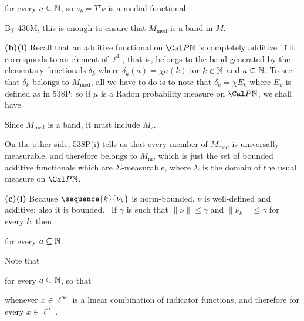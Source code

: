 {

\noindent for every $a\subseteq\Bbb N$, so $\nu_b=T'\nu$ is a medial
functional.\ \Qed

By 436M, this is enough to ensure that $M_{\text{med}}$ is a band in $M$.

\medskip

{\bf (b)(i)} Recall that an additive functional on $\Cal P\Bbb N$
is completely additive iff it corresponds to an element of $\ell^1$,
that is,
belongs to the band generated by the elementary functionals $\delta_k$
where $\delta_k(a)=\chi a(k)$ for $k\in\Bbb N$ and $a\subseteq\Bbb N$.
To see that $\delta_k$ belongs to $M_{\text{med}}$, all we have to do is
to note that $\delta_k=\chi E_k$ where $E_k$ is defined as in 538P;
so if $\mu$ is a  Radon probability measure on $\Cal P\Bbb N$, we shall
have


\noindent Since $M_{\text{med}}$ is a band, it must include $M_{\tau}$.

\medskip

 On the other side, 538P(i) tells us that every member of
$M_{\text{med}}$ is universally measurable, and therefore belongs to
$M_{\text{m}}$, which is just the set of bounded additive
functionals which are $\Sigma$-measurable, where $\Sigma$ is the domain of
the usual measure on $\Cal P\Bbb N$.

\medskip

{\bf (c)(i)} Because $\sequence{k}{\nu_k}$ is norm-bounded, $\tilde\nu$ is
well-defined and additive;  also it is bounded.
\Prf\ If $\gamma$ is such that
$\|\nu\|\le\gamma$ and $\|\nu_k\|\le\gamma$ for every $k$, then


\noindent for every $a\subseteq\Bbb N$.\ \Qed

Note that


\noindent for every $a\subseteq\Bbb N$, so that


\noindent whenever $x\in\ell^{\infty}$ is a linear combination of
indicator functions, and therefore for every $x\in\ell^{\infty}$.

}
